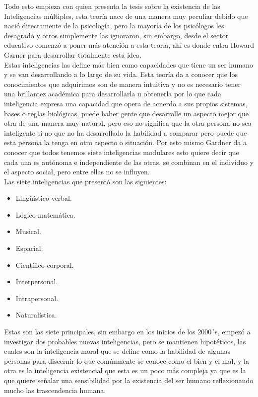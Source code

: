 Todo esto empieza con \textcite{gardnermultnin}  quien presenta la tesis sobre
la existencia de las Inteligencias múltiples, esta teoría nace de una manera muy
peculiar debido que nació directamente de la psicología, pero la mayoría de los
psicólogos les desagradó y otros simplemente las ignoraron, sin embargo, desde
el sector educativo comenzó a poner más atención a esta teoría, ahí es donde
entra Howard Garner para desarrollar totalmente esta idea.\\ 
Estas inteligencias las define más bien como capacidades que tiene un ser humano
y se van desarrollando a lo largo de su vida. Esta teoría da a conocer que los
conocimientos que adquirimos son de manera intuitiva y no es necesario tener una
brillantez académica para desarrollarla u obtenerla por lo que cada inteligencia
expresa una capacidad que opera de acuerdo a sus propios sistemas, bases o
reglas biológicas, puede haber gente que desarrolle un aspecto mejor que otra de
una manera muy natural, pero eso no significa que la otra persona no sea
inteligente si no que no ha desarrollado la habilidad a comparar pero puede que
esta persona la tenga en otro aspecto o situación. Por esto mismo Gardner da a
conocer que todos tenemos siete inteligencias modulares esto quiere decir que
cada una es autónoma e independiente de las otras, se combinan en el individuo y
el aspecto social, pero entre ellas no se influyen.\\
Las siete inteligencias que present\'o son las siguientes:
\begin{itemize}
\item Lingüístico-verbal.
\item Lógico-matemática.
\item Musical.
\item Espacial.
\item Científico-corporal.
\item Interpersonal.
\item Intrapersonal.
\item Naturalística.
\end{itemize}
Estas son las siete principales, sin embargo en los inicios de los 2000´s,
empezó a investigar dos probables nuevas inteligencias, pero se mantienen
hipotéticos, las cuales son la inteligencia moral que se define como la
habilidad de algunas personas para discernir lo que comúnmente se conoce como el
bien y el mal, y la otra es la inteligencia existencial que esta es un poco más
compleja ya que es la que quiere señalar una sensibilidad por la existencia del
ser humano reflexionando mucho las trascendencia humana.\\
